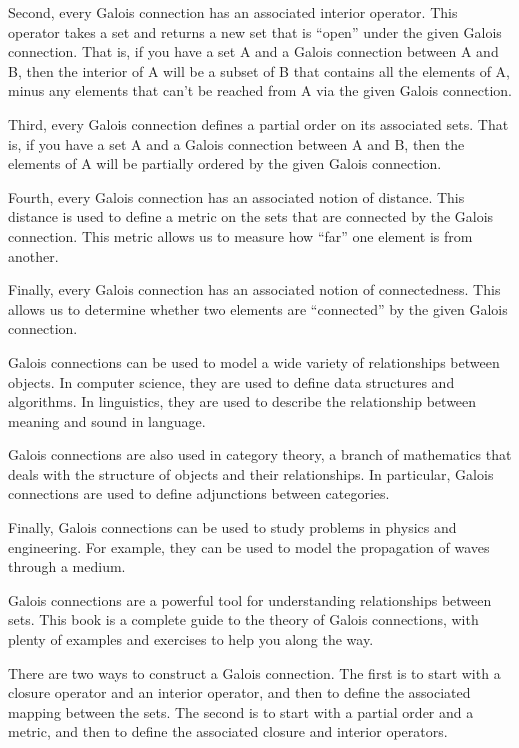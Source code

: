 \documentclass[
  letterpaper,
  10pt,
  reqno,
  twopage,
  openany]{book}
\theoremstyle{plain}
\theoremstyle{definition}
\theoremstyle{definition}
\theoremstyle{definition}
\theoremstyle{plain}
\theoremstyle{plain}
\theoremstyle{remark}
\begin{document}
Second, every Galois connection has an associated interior operator.
This operator takes a set and returns a new set that is ``open'' under
the given Galois connection. That is, if you have a set A and a Galois
connection between A and B, then the interior of A will be a subset of B
that contains all the elements of A, minus any elements that can't be
reached from A via the given Galois connection.

Third, every Galois connection defines a partial order on its associated
sets. That is, if you have a set A and a Galois connection between A and
B, then the elements of A will be partially ordered by the given Galois
connection.

Fourth, every Galois connection has an associated notion of distance.
This distance is used to define a metric on the sets that are connected
by the Galois connection. This metric allows us to measure how ``far''
one element is from another.

Finally, every Galois connection has an associated notion of
connectedness. This allows us to determine whether two elements are
``connected'' by the given Galois connection.

Galois connections can be used to model a wide variety of relationships
between objects. In computer science, they are used to define data
structures and algorithms. In linguistics, they are used to describe the
relationship between meaning and sound in language.

Galois connections are also used in category theory, a branch of
mathematics that deals with the structure of objects and their
relationships. In particular, Galois connections are used to define
adjunctions between categories.

Finally, Galois connections can be used to study problems in physics and
engineering. For example, they can be used to model the propagation of
waves through a medium.

Galois connections are a powerful tool for understanding relationships
between sets. This book is a complete guide to the theory of Galois
connections, with plenty of examples and exercises to help you along the
way.

There are two ways to construct a Galois connection. The first is to
start with a closure operator and an interior operator, and then to
define the associated mapping between the sets. The second is to start
with a partial order and a metric, and then to define the associated
closure and interior operators.
\end{document}
